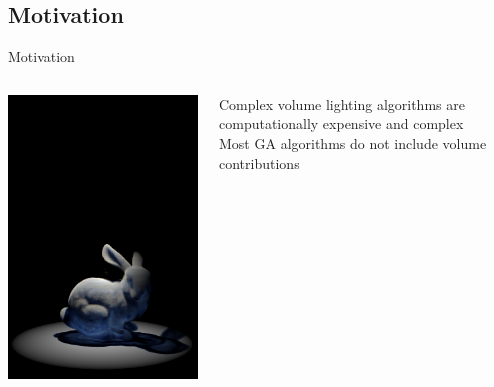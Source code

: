 \documentclass[10pt,handout,compress,professionalfont]{beamer}
\begin{document}
\subsection{Motivation}
\begin{frame}{Motivation}

    \begin{columns}
        \begin{column}{0.35\textwidth}
            {\centering \includegraphics[width=\textwidth]{../img/bunny_spot_sad}\\}

        \end{column}
        \begin{column}{0.65\textwidth}
            Complex volume lighting algorithms are computationally expensive and complex\\
            \vspace{8mm}
            Most GA algorithms do not include volume contributions\\
            
        \end{column}
    \end{columns}
\end{frame}
\end{document}
